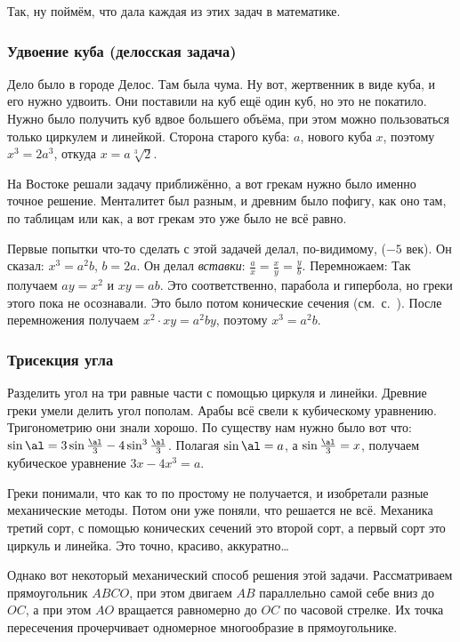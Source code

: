 \documentclass[a4paper,oneside,fleqn,10pt]{article}
\begin{document}
Так, ну поймём, что дала каждая из этих задач в математике.

\subsubsection{Удвоение куба (делосская задача)}

Дело было в городе Делос. Там была чума. Ну вот, жертвенник в виде
куба, и его нужно удвоить. Они поставили на куб ещё один куб, но это
не покатило. Нужно было получить куб вдвое большего объёма, при этом
можно пользоваться только циркулем и линейкой. Сторона старого куба:
$a$, нового куба $x$, поэтому $x^3 = 2a^3$, откуда $x = a\sqrt[3]{2}$.

На Востоке решали задачу приближённо, а вот грекам нужно было именно
точное решение.  Менталитет был разным, и древним было пофигу, как оно
там, по таблицам или как, а вот грекам это уже было не всё равно.

Первые попытки что-то сделать с этой задачей делал, по-видимому,
 ($-5$ век). Он сказал: $x^3 = a^2b$, $b =
2a$. Он делал \emph{вставки}: $\frac{a}{x} = \frac{x}{y} =
\frac{y}{b}$. Перемножаем: Так получаем $ay = x^2$ и $ xy = ab$. Это
соответственно, парабола и гипербола, но греки этого пока не
осознавали. Это было потом конические сечения
(см.~с.~\pageref{sec:conicae}).  После перемножения получаем $x^2
\cdot xy = a^2 by$, поэтому $x^3 = a^2b$. 

\subsubsection{Трисекция угла}

Разделить угол на три равные части с помощью циркуля и линейки.
Древние греки умели делить угол пополам. Арабы всё свели к кубическому
уравнению.  Тригонометрию они знали хорошо. По существу нам нужно было
вот что: $\sin \al = 3 \sin\frac\al3 - 4\sin^3\frac\al3$.  Полагая
$\sin\al = a$, а $\sin\frac\al3 = x$, получаем кубическое уравнение
$3x-4x^3 = a$.

Греки понимали, что как то по простому не получается, и изобретали
разные механические методы. Потом они уже поняли, что решается не
всё. Механика третий сорт, с помощью конических сечений это второй
сорт, а первый сорт это циркуль и линейка. Это точно, красиво,
аккуратно\ldots

Однако вот некоторый механический способ решения этой задачи.
Рассматриваем прямоугольник $ABCO$, при этом двигаем $AB$ параллельно
самой себе вниз до $OC$, а при этом $AO$ вращается равномерно до $OC$
по часовой стрелке.  Их точка пересечения прочерчивает одномерное
многообразие в прямоугольнике.
\end{document}
